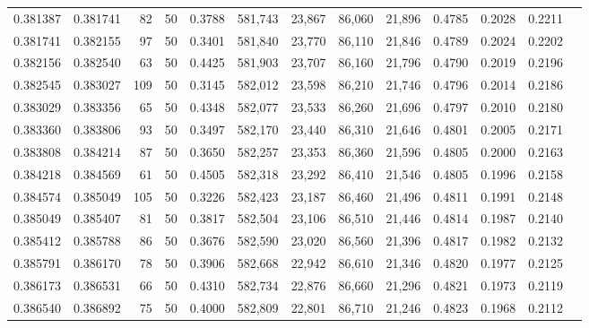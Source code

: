 \begin{tabular}{rrrrrrrrrrrrr}
0.381387 & 0.381741 &    82 &  50 &                                     0.3788 & 581,743 &  23,867 &  86,060 &  21,896 & 0.4785 & 0.2028 & 0.2211 \\
0.381741 & 0.382155 &    97 &  50 &                                     0.3401 & 581,840 &  23,770 &  86,110 &  21,846 & 0.4789 & 0.2024 & 0.2202 \\
0.382156 & 0.382540 &    63 &  50 &                                     0.4425 & 581,903 &  23,707 &  86,160 &  21,796 & 0.4790 & 0.2019 & 0.2196 \\
0.382545 & 0.383027 &   109 &  50 &                                     0.3145 & 582,012 &  23,598 &  86,210 &  21,746 & 0.4796 & 0.2014 & 0.2186 \\
0.383029 & 0.383356 &    65 &  50 &                                     0.4348 & 582,077 &  23,533 &  86,260 &  21,696 & 0.4797 & 0.2010 & 0.2180 \\
0.383360 & 0.383806 &    93 &  50 &                                     0.3497 & 582,170 &  23,440 &  86,310 &  21,646 & 0.4801 & 0.2005 & 0.2171 \\
0.383808 & 0.384214 &    87 &  50 &                                     0.3650 & 582,257 &  23,353 &  86,360 &  21,596 & 0.4805 & 0.2000 & 0.2163 \\
0.384218 & 0.384569 &    61 &  50 &                                     0.4505 & 582,318 &  23,292 &  86,410 &  21,546 & 0.4805 & 0.1996 & 0.2158 \\
0.384574 & 0.385049 &   105 &  50 &                                     0.3226 & 582,423 &  23,187 &  86,460 &  21,496 & 0.4811 & 0.1991 & 0.2148 \\
0.385049 & 0.385407 &    81 &  50 &                                     0.3817 & 582,504 &  23,106 &  86,510 &  21,446 & 0.4814 & 0.1987 & 0.2140 \\
0.385412 & 0.385788 &    86 &  50 &                                     0.3676 & 582,590 &  23,020 &  86,560 &  21,396 & 0.4817 & 0.1982 & 0.2132 \\
0.385791 & 0.386170 &    78 &  50 &                                     0.3906 & 582,668 &  22,942 &  86,610 &  21,346 & 0.4820 & 0.1977 & 0.2125 \\
0.386173 & 0.386531 &    66 &  50 &                                     0.4310 & 582,734 &  22,876 &  86,660 &  21,296 & 0.4821 & 0.1973 & 0.2119 \\
0.386540 & 0.386892 &    75 &  50 &                                     0.4000 & 582,809 &  22,801 &  86,710 &  21,246 & 0.4823 & 0.1968 & 0.2112 \\

\end{tabular}
